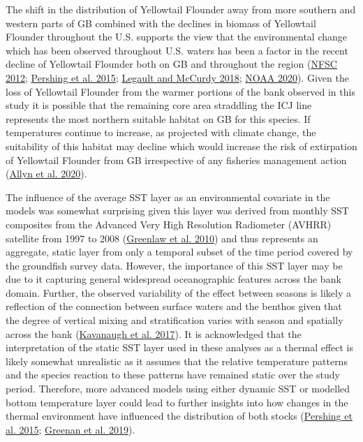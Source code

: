 \documentclass[
]{article}
\begin{document}
The shift in the distribution of Yellowtail Flounder away from more southern and western parts of GB combined with the declines in biomass of Yellowtail Flounder throughout the U.S. supports the view that the environmental change which has been observed throughout U.S. waters has been a factor in the recent decline of Yellowtail Flounder both on GB and throughout the region (\protect\hyperlink{ref-nfsc54thNortheastRegional2012}{NFSC 2012}; \protect\hyperlink{ref-pershingSlowAdaptationFace2015}{Pershing et al. 2015}; \protect\hyperlink{ref-legaultStockAssessmentGeorges2018}{Legault and McCurdy 2018}; \protect\hyperlink{ref-NOAAYellowtailFlounder2020}{NOAA 2020}). Given the loss of Yellowtail Flounder from the warmer portions of the bank observed in this study it is possible that the remaining core area straddling the ICJ line represents the most northern suitable habitat on GB for this species. If temperatures continue to increase, as projected with climate change, the suitability of this habitat may decline which would increase the risk of extirpation of Yellowtail Flounder from GB irrespective of any fisheries management action (\protect\hyperlink{ref-allynComparingSynthesizingQuantitative2020}{Allyn et al. 2020}).

The influence of the average SST layer as an environmental covariate in the models was somewhat surprising given this layer was derived from monthly SST composites from the Advanced Very High Resolution Radiometer (AVHRR) satellite from 1997 to 2008 (\protect\hyperlink{ref-greenlawGeodatabaseHistoricalContemporary2010}{Greenlaw et al. 2010}) and thus represents an aggregate, static layer from only a temporal subset of the time period covered by the groundfish survey data. However, the importance of this SST layer may be due to it capturing general widespread oceanographic features across the bank domain. Further, the observed variability of the effect between seasons is likely a reflection of the connection between surface waters and the benthos given that the degree of vertical mixing and stratification varies with season and spatially across the bank (\protect\hyperlink{ref-kavanaughThirtyThreeYearsOcean2017}{Kavanaugh et al. 2017}). It is acknowledged that the interpretation of the static SST layer used in these analyses as a thermal effect is likely somewhat unrealistic as it assumes that the relative temperature patterns and the species reaction to these patterns have remained static over the study period. Therefore, more advanced models using either dynamic SST or modelled bottom temperature layer could lead to further insights into how changes in the thermal environment have influenced the distribution of both stocks (\protect\hyperlink{ref-pershingSlowAdaptationFace2015}{Pershing et al. 2015}; \protect\hyperlink{ref-greenanClimateChangeVulnerability2019}{Greenan et al. 2019}).
\end{document}
